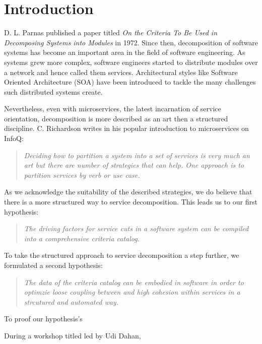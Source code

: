 \chapter{Introduction}

D. L. Parnas published a paper titled \textit{On the Criteria To Be Used in Decomposing Systems into Modules}\cite{parnaDecomposing} in 1972. Since then, decomposition of software systems has become an important area in the field of software engineering. As systems grew more complex, software engineers started to distribute modules over a network and hence called them services. Architectural styles like Software Oriented Architecture (SOA) have been introduced to tackle the many challenges such distributed systems create. 

Nevertheless, even with microservices, the latest incarnation of service orientation, decomposition is more described as an art then a structured discipline. C. Richardson writes in his popular introduction to microservices on InfoQ:

\begin{quote}
	\textit{Deciding how to partition a system into a set of services is very much an art but there are number of strategies that can help. One approach is to partition services by verb or use case.}\cite{richardson2014microservices}
\end{quote}

As we acknowledge the suitability of the described strategies, we do believe that there is a more structured way to service decomposition. This leads us to our first hypothesis:

\begin{quote}
	\textit{The driving factors for service cuts in a software system can be compiled into a comprehensive criteria catalog.}
\end{quote}

To take the structured approach to service decomposition a step further, we formulated a second hypothesis:

\begin{quote}
	\textit{The data of the criteria catalog can be embodied in software in order to optimzie loose coupling between and high cohesion within services in a strcutured and automated way.}
\end{quote}

To proof our hypothesis's 




During a workshop titled  led by Udi Dahan, 


